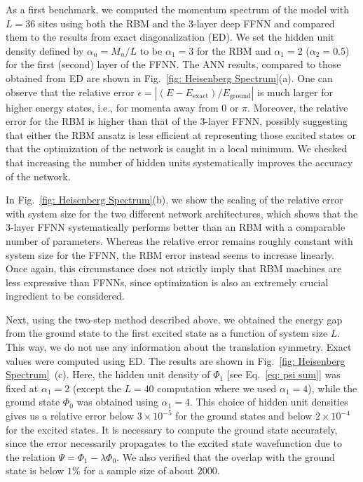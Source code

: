 \documentclass[aps,prl,twocolumn,amsmath,amssymb,superscriptaddress,floatfix]{revtex4-1}
\begin{document}
As a first benchmark, we computed the momentum spectrum of the model with $L=36$ sites using both the RBM and the 3-layer deep FFNN and compared them to the results from exact diagonalization (ED). We set the hidden unit density defined by $\alpha_n = M_n/L$ to be $\alpha_1=3$ for the RBM and $\alpha_1=2$ ($\alpha_2=0.5$) for the first (second) layer of the FFNN. The ANN results, compared to those obtained from ED are shown in Fig.~\ref{fig: Heisenberg Spectrum}(a). One can observe that the relative error $\epsilon = \left| (E - E_{\textrm{exact}})/E_{\textrm{ground}} \right|$ is much larger for higher energy states, i.e., for momenta away from $0$ or $\pi$. Moreover, the relative error for the RBM is higher than that of the 3-layer FFNN, possibly suggesting that either the RBM ansatz is less efficient at representing those excited states or that the optimization of the network is caught in a local minimum. We checked that increasing the number of hidden units systematically improves the accuracy of the network. 

In Fig.~\ref{fig: Heisenberg Spectrum}(b), we show the scaling of the relative error with system size for the two different network architectures, which shows that the 3-layer FFNN systematically performs better than an RBM with a comparable number of parameters.  
Whereas the relative error remains roughly constant with system size for the FFNN,  the RBM error instead seems to increase linearly. Once again, this circumstance does not strictly imply that RBM machines are less expressive than FFNNs, since optimization is also an extremely crucial ingredient to be considered. 


Next, using the two-step method described above, we obtained the energy gap from the ground state to the first excited state as a function of system size $L$. This way, we do not use any information about the translation symmetry. Exact values were computed using ED. The results are shown in Fig.~\ref{fig: Heisenberg Spectrum}~(c).  Here, the hidden unit density of $\Phi_{1}$ [see Eq.~\eqref{eq: psi sum}] was fixed at $\alpha_1 =2$ (except the $L=40$ computation where we used $\alpha_1 = 4$), while the ground state $\Phi_{0}$ was obtained using $\alpha_1 = 4$. This choice of hidden unit densities gives us a relative error below $3 \times 10^{-5}$ for the ground states and below $2 \times 10^{-4}$ for the excited states. It is necessary to compute the ground state accurately, since the error necessarily propagates to the excited state wavefunction due to the relation $\Psi = \Phi_{1} - \lambda \Phi_{0}$.  We also verified that the overlap with the ground state is below $1\%$ for a sample size of about $2000$.
\end{document}
